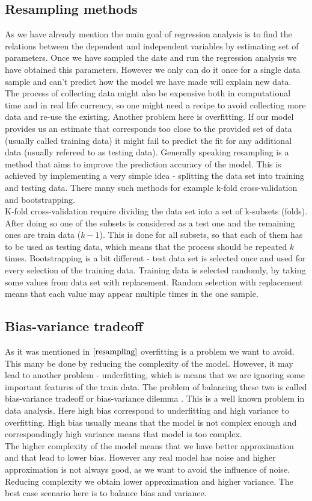 \documentclass[10pt]{article}
\begin{document}
\subsection{Resampling methods}\label{resampling}
As we have already mention the main goal of regression analysis is to find the relations between the dependent and independent variables by estimating set of parameters. Once we have sampled the date and run the regression analysis we have obtained this parameters. However we only can do it once for a single data sample and can't predict how the model we have made will explain new data. The process of collecting data might also be expensive both in computational time and in real life currency, so one might need a recipe to avoid collecting more data and re-use the existing. Another problem here is overfitting. If our model provides us an estimate that corresponds too close to the provided set of data (usually called training data) it might fail to predict the fit for any additional data (usually refereed to as testing data). Generally speaking resampling is a method that aims to improve the prediction accuracy of the model. This is achieved by implementing a very simple idea - splitting the data set into training and testing data. There many such methods for example k-fold cross-validation and bootstrapping. \\
K-fold cross-validation require dividing the data set into a set of k-subsets (folds). After doing so one of the subsets is considered as a test one and the remaining ones are train data ($k-1$). This is done for all subsets, so that each of them has to be used as testing data, which means that the process should be repeated $k$ times. Bootstrapping is a bit different - test data set is selected once and used for every selection of the training data. Training data is selected randomly, by taking some values from data set with replacement. Random selection with replacement means that each value may appear multiple times in the one sample.
 
\subsection{Bias-variance tradeoff}

As it was mentioned in $\ref{resampling}$ overfitting is a problem we want to avoid. This many be done by reducing the complexity of the model. However, it may lead to another problem - underfitting, which is means that we are ignoring some important features of the train data. The problem of balancing these two is called bias-variance tradeoff or bias-variance dilemma \cite{biasvar}. This is a well known problem in data analysis. Here high bias correspond to underfitting and high variance to overfitting. High bias usually means that the model is not complex enough and correspondingly high variance means that model is too complex. \\
The higher complexity of the model means that we have better approximation and that lead to lower bias. However any real model has noise and higher approximation is not always good, as we want to avoid the influence of noise. Reducing complexity we obtain lower approximation and higher variance. The best case scenario here is to balance bias and variance.  
\end{document}

